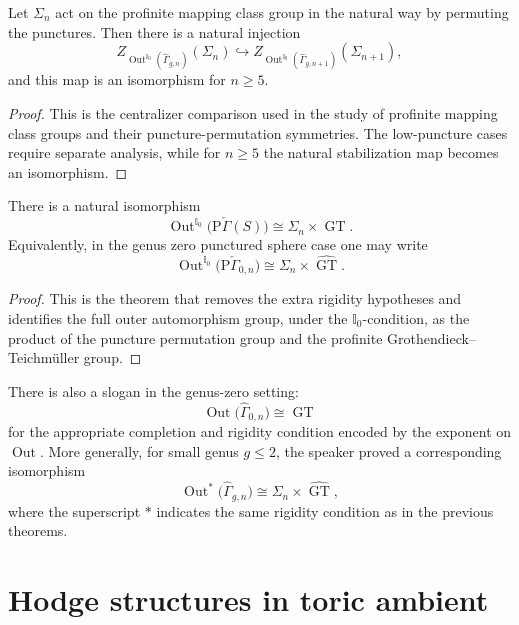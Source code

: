 \begin{theorem}\label{thm:hoshi-mochizuki-centralizer}
Let \(\Sigma_n\) act on the profinite
mapping class group in the natural way by
permuting the punctures. Then there is a
natural injection
$$
Z_{\operatorname{Out}^{\mathbb{I}_0}
(\widehat{\Gamma}_{g,n})}(\Sigma_n)
\hookrightarrow
Z_{\operatorname{Out}^{\mathbb{I}_0}
(\widehat{\Gamma}_{g,n+1})}(\Sigma_{n+1}),
$$
and this map is an isomorphism for \(n\ge 5\).
\end{theorem}

\begin{proof}
This is the centralizer comparison used in
the study of profinite mapping class groups
and their puncture-permutation symmetries.
The low-puncture cases require separate
analysis, while for \(n\ge 5\) the natural
stabilization map becomes an isomorphism.
\end{proof}

\begin{theorem}\label{thm:hoshi-minamide-mochizuki}
There is a natural isomorphism
$$
\operatorname{Out}^{\mathbb{I}_0}
\bigl(\mathrm{P}\check\Gamma(S)\bigr)
\cong
\Sigma_n \times \widehat{\operatorname{GT}}.
$$
Equivalently, in the genus zero punctured
sphere case one may write
$$
\operatorname{Out}^{\mathbb{I}_0}
\bigl(\mathrm{P}\check\Gamma_{0,n}\bigr)
\cong
\Sigma_n \times \widehat{\operatorname{GT}}.
$$
\end{theorem}

\begin{proof}
This is the theorem that removes the extra
rigidity hypotheses and identifies the full
outer automorphism group, under the
\(\mathbb{I}_0\)-condition, as the product of
the puncture permutation group and the
profinite Grothendieck--Teichm\"uller group.
\end{proof}

\medskip\noindent
There is also a slogan in the genus-zero
setting:
$$
\operatorname{Out}\bigl(\widehat{\Gamma}_{0,n}\bigr)
\cong \widehat{\operatorname{GT}}
$$
for the appropriate completion and rigidity
condition encoded by the exponent on
\(\operatorname{Out}\). More generally, for
small genus \(g\leq 2\), the speaker proved a
corresponding isomorphism
$$
\operatorname{Out}^{\ast}\bigl(\widehat{\Gamma}_{g,n}\bigr)
\cong
\Sigma_n \times \widehat{\operatorname{GT}},
$$
where the superscript \(\ast\) indicates the
same rigidity condition as in the previous
theorems.

\section{Hodge structures in toric ambient}
\label{section-hodge-structures-toric-ambient}

